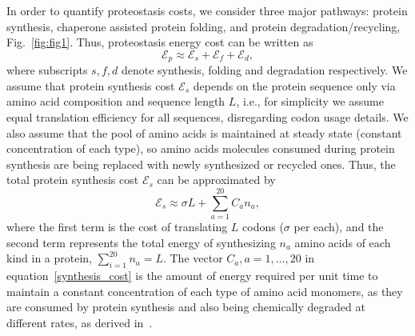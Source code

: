 \documentclass[10pt,letterpaper]{article}
\begin{document}
In order to quantify proteostasis costs, we consider three major pathways: protein synthesis, chaperone assisted protein folding, and protein degradation/recycling,  Fig.~\ref{fig:fig1}. Thus, proteostasis energy cost can be written as
\begin{equation}
	\label{proteostasis_cost_expansion}
	\mathcal{E}_{p} \approx \mathcal{E}_{s} + \mathcal{E}_{f} + \mathcal{E}_{d},
\end{equation}
where subscripts $s,f,d$ denote synthesis, folding and degradation respectively. We assume that protein synthesis cost $\mathcal{E}_{s}$ depends on the protein sequence only via amino acid composition and sequence length $L$, i.e., for simplicity we assume equal translation efficiency for all sequences, disregarding codon usage details. We also assume that the pool of amino acids is maintained at steady state (constant concentration of each type), so amino acids molecules consumed during protein synthesis are being replaced with newly synthesized or recycled ones. Thus, the total protein synthesis cost $\mathcal{E}_{s}$ can be approximated by
\begin{equation}
	\label{synthesis_cost}
	\mathcal{E}_{s} \approx \sigma L + \sum\limits_{a=1}^{20}C_{a}n_{a},
\end{equation}
where the first term is the cost of translating $L$ codons ($\sigma$ per each), and the second term represents the total energy of synthesizing $n_{a}$ amino acids of each kind in a protein, $\sum\limits_{i=1}^{20}n_{a} = L$. The vector $C_{a}, a=1,\dots,20$ in equation~\eqref{synthesis_cost} is the amount of energy required per unit time to maintain a constant concentration of each type of amino acid monomers, as they are consumed by protein synthesis and also being chemically degraded at different rates, as derived in~\cite{Krick2014Amino}. 
 
\end{document}

